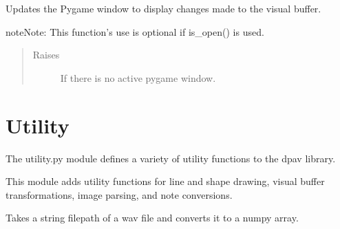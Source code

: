 \documentclass[letterpaper,10pt,english,openany,oneside]{sphinxmanual}
\begin{document}
\begin{fulllineitems}
\begin{fulllineitems}
\begin{quote}
\begin{description}
\end{description}\end{quote}

\end{fulllineitems}



\begin{fulllineitems}

\pysigstartsignatures
{}
\pysigstopsignatures
\sphinxAtStartPar
Updates the Pygame window to display changes made to the visual buffer.

\begin{sphinxadmonition}{note}{Note:}
\sphinxAtStartPar
This function’s use is optional if is\_open() is used.
\end{sphinxadmonition}
\begin{quote}\begin{description}
\item[{Raises}] \leavevmode
\sphinxAtStartPar
{} \textendash{} If there is no active pygame window.

\end{description}\end{quote}

\end{fulllineitems}


\end{fulllineitems}



\section{Utility}
\label{\detokenize{dpav:utility}}
\sphinxAtStartPar
The utility.py module defines a variety of utility functions to the dpav library.

\sphinxAtStartPar
This module adds utility functions for line and shape drawing, visual buffer
transformations, image parsing, and note conversions.


\begin{fulllineitems}

\pysigstartsignatures
{}
\pysigstopsignatures
\sphinxAtStartPar
Takes a string filepath of a wav file and converts it to a numpy array.

\end{fulllineitems}
\end{document}
